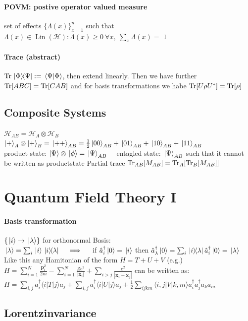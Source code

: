 \paragraph{POVM: postive operator valued measure} set of effects $\{ \Lambda (x)\}^n_{x=1}$ such that
$\Lambda(x) \in \operatorname{Lin}(\mathcal{H}) : \Lambda(x) \geq 0 \ \forall x, \ \sum_x \Lambda(x) =$ $1$

\paragraph{Trace (abstract)} $\Trace{\ketbra*{\Phi}{\Psi}} := \braket*{\Psi}{\Phi}$, then extend linearly. Then we have further\\
$\Trace[ABC]= \Trace[CAB]$ and for basis transformations we habe $\Tr[U \rho U^* ]= \Tr[\rho]$\\

\subsection{Composite Systems} 
$\mathcal{H}_{AB} = \mathcal{H}_A \otimes \mathcal{H}_B$\\
$\ket{+}_A\otimes \ket{+}_B = \ket*{++}_{AB} = \frac{1}{2} \ket*{00}_{AB}+ \ket*{01}_{AB}+ \ket*{10}_{AB}+\ket*{11}_{AB}$\\
product state: $\ket{\Psi}\otimes \ket*{\phi} = \ket*{\Psi}_{AB} \quad$ entagled state: $\ket*{\Psi}_{AB}$ such that it cannot be written as productstate
Partial trace $\Tr_{AB}[M_{AB}] = \Tr_A[\Tr_B[M_{AB}]]$


\section{Quantum Field Theory I}

\paragraph{Basis transformation} $\{ \ket*{i} \to \ket*{\lambda} \}$  for orthonormal Basis:\\ 
$\ket*{\lambda } = \sum_i \ket*{i} \ketbra*{i}{\lambda} \quad   \implies  \quad $ if $\hat{a}_i^\dagger \ket*{0} = \ket*{i}$ then 
$\hat{a}_\lambda^\dagger \ket*{0} = \sum_i \ketbra*{i}{\lambda} \hat{a}_i^\dagger \ket{0} = \ket*{\lambda} $\\

Like this any Hamitonian of the form $H=T+U+V$ (e.g.) \\ 
$H=\sum_{i=1}^N \frac{\mathbf{p}_i^2}{2 m}-\sum_{i=1}^N \frac{Z e^2}{\left|\mathbf{x}_i\right|}+\sum_{i>j} \frac{e^2}{\left|\mathbf{x}_i-\mathbf{x}_j\right|}$
can be written as:\\
$H=\sum_{i, j} a_i^{\dagger}\langle i|T| j\rangle a_j+\sum_{i, j} a_i^{\dagger}\langle i|U| j\rangle a_j+\frac{1}{2} \sum_{i j k m}\langle i, j|V| k, m\rangle a_i^{\dagger} a_j^{\dagger} a_k a_m$

\subsection{Lorentzinvariance}







